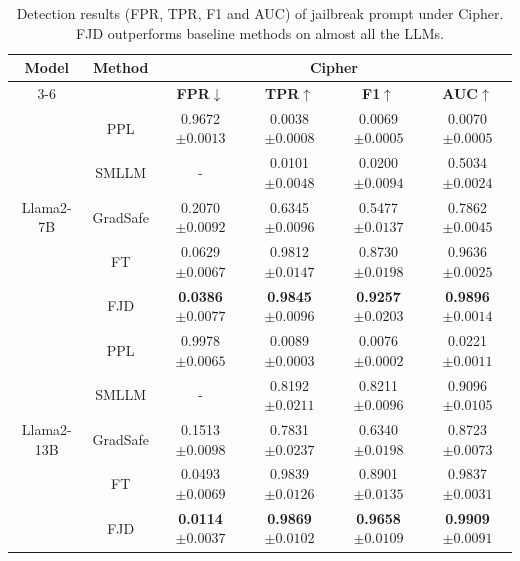 \documentclass{article}
\begin{document}
\begin{table}[t]
  \caption{Detection results (FPR, TPR, F1 and AUC) of jailbreak prompt under Cipher. FJD outperforms baseline methods on almost all the LLMs.}
  \label{cipher more}

  \centering
  \setlength\tabcolsep{14pt}
  \footnotesize


  \begin{tabular}{cccccc}
    \toprule
    \multirow{2}{*}{\textbf{Model}}  &  \multirow{2}{*}{\textbf{Method}} & \multicolumn{4}{c}{\textbf{Cipher}} \\
    \cmidrule(r){3-6}

    & & \textbf{FPR$\downarrow$}& \textbf{TPR$\uparrow$}& \textbf{F1$\uparrow$}&\textbf{AUC$\uparrow$}\\
    
    \midrule
    \multirow{5}{*}{Llama2-7B} 
    & PPL & 0.9672\tiny{$\pm 0.0013$} & 0.0038\tiny{$\pm 0.0008$} & 0.0069\tiny{$\pm 0.0005$} & 0.0070\tiny{$\pm 0.0005$} \\
    & SMLLM & - & 0.0101\tiny{$\pm 0.0048$} & 0.0200\tiny{$\pm 0.0094$} & 0.5034\tiny{$\pm 0.0024$}  \\
    & GradSafe & 0.2070\tiny{$\pm 0.0092$} & 0.6345\tiny{$\pm 0.0096$} & 0.5477\tiny{$\pm 0.0137$} & 0.7862\tiny{$\pm 0.0045$}   \\
    & FT & 0.0629\tiny{$\pm 0.0067$} & 0.9812\tiny{$\pm 0.0147$} & 0.8730\tiny{$\pm 0.0198$} & 0.9636\tiny{$\pm 0.0025$} \\
    & FJD & \textbf{0.0386}\tiny{$\pm 0.0077$} & \textbf{0.9845}\tiny{$\pm 0.0096$} & \textbf{0.9257}\tiny{$\pm 0.0203$} & \textbf{0.9896}\tiny{$\pm 0.0014$}  \\
    \midrule
    \multirow{5}{*}{Llama2-13B} 
    & PPL & 0.9978\tiny{$\pm 0.0065$} & 0.0089\tiny{$\pm 0.0003$} & 0.0076\tiny{$\pm 0.0002$} & 0.0221\tiny{$\pm 0.0011$} \\
    & SMLLM & - & 0.8192\tiny{$\pm 0.0211$} & 0.8211\tiny{$\pm 0.0096$} & 0.9096\tiny{$\pm 0.0105$} \\
    & GradSafe & 0.1513\tiny{$\pm 0.0098$} & 0.7831\tiny{$\pm 0.0237$} & 0.6340\tiny{$\pm 0.0198$} & 0.8723\tiny{$\pm 0.0073$} \\
    & FT & 0.0493\tiny{$\pm 0.0069$} & 0.9839\tiny{$\pm 0.0126$} & 0.8901\tiny{$\pm 0.0135$} & 0.9837\tiny{$\pm 0.0031$} \\
    & FJD & \textbf{0.0114}\tiny{$\pm 0.0037$} & \textbf{0.9869}\tiny{$\pm 0.0102$} & \textbf{0.9658}\tiny{$\pm 0.0109$} & \textbf{0.9909}\tiny{$\pm 0.0091$} \\
    

\end{tabular}
\end{table}
\end{document}
